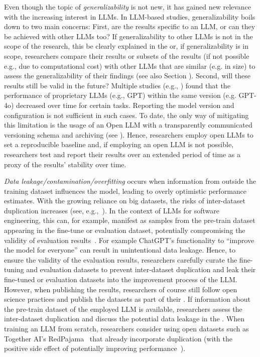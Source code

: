 Even though the topic of \emph{generalizability} is not new, it has gained new relevance with the increasing interest in LLMs. In LLM-based studies, generalizability boils down to two main concerns:
First, are the results specific to an LLM, or can they be achieved with other LLMs too? 
If generalizability to other LLMs is not in the scope of the research, this \must be clearly explained in the \paper or, if generalizability is in scope, researchers \must compare their results or subsets of the results (if not possible e.g., due to computational cost) with other LLMs that are similar (e.g. in size) to assess the generalizability of their findings (see also Section \openllm).
Second, will these results still be valid in the future?
Multiple studies (e.g., \cite{DBLP:journals/corr/abs-2307-09009, doi:10.1148/radiol.232411}) found that the performance of proprietary LLMs (e.g., GPT) within the same version (e.g. GPT-4o) decreased over time for certain tasks.
Reporting the model version and configuration is not sufficient in such cases. To date, the only way of mitigating this limitation is the usage of an Open LLM with a transparently communicated versioning schema and archiving (see \openllm). Hence, researchers \should employ open LLMs to set a reproducible baseline and, if employing an open LLM is not possible, researchers \should test and report their results over an extended period of time as a proxy of the results' stability over time.

\emph{Data leakage/contamination/overfitting} occurs when information from outside the training dataset influences the model, leading to overly optimistic performance estimates.
With the growing reliance on big datasets, the risks of inter-dataset duplication increases (see, e.g.,~\cite{DBLP:journals/pacmpl/LopesMMSYZSV17, DBLP:conf/oopsla/Allamanis19}). 
In the context of LLMs for software engineering, this can, for example, manifest as samples from the pre-train dataset appearing in the fine-tune or evaluation dataset, potentially compromising the validity of evaluation results~\cite{DBLP:journals/tse/LopezCSSV25}.
For example ChatGPT's functionality to ``improve the model for everyone'' can result in unintentional data leakage.
Hence, to ensure the validity of the evaluation results, researchers \should carefully curate the fine-tuning and evaluation datasets to prevent inter-dataset duplication and \mustnot leak their fine-tuned or evaluation datasets into the improvement process of the LLM.
However, when publishing the results, researchers \should of course still follow open science practices and publish the datasets as part of their \supplementarymaterial.
If information about the pre-train dataset of the employed LLM is available, researchers \should assess the inter-dataset duplication and \must discuss the potential data leakage in the \paper.
When training an LLM from scratch, researchers \may consider using open datasets such as Together AI's RedPajama~\cite{together2023redpajama} that already incorporate duplication (with the positive side effect of potentially improving performance~\cite{DBLP:conf/acl/LeeINZECC22}).

